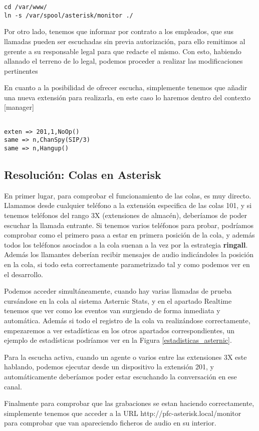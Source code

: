 \begin{lstlisting}[style=consola]
cd /var/www/
ln -s /var/spool/asterisk/monitor ./
\end{lstlisting}

Por otro lado, tenemos que informar por contrato a los empleados, que sus llamadas pueden ser escuchadas sin previa autorización, para ello remitimos al gerente a su responsable legal para que redacte el mismo. Con esto, habiendo allanado el terreno de lo legal, podemos proceder a realizar las modificaciones pertinentes

En cuanto a la posibilidad de ofrecer escucha, simplemente tenemos que añadir una nueva extensión para realizarla, en este caso lo haremos dentro del contexto [manager]

\begin{lstlisting}[style=bash,title={/etc/asterisk/extensions.conf}]

exten => 201,1,NoOp()
same => n,ChanSpy(SIP/3)
same => n,Hangup()

\end{lstlisting}

\subsection{Resolución: Colas en Asterisk}

En primer lugar, para comprobar el funcionamiento de las colas, es muy directo. Llamamos desde cualquier teléfono a la extensión especifica de las colas 101, y si tenemos teléfonos del rango 3X (extensiones de almacén), deberíamos de poder escuchar la llamada entrante. Si tenemos varios teléfonos para probar, podríamos comprobar como el primero pasa a estar en primera posición de la cola, y además todos los teléfonos asociados a la cola suenan a la vez por la estrategia \textbf{ringall}. Además los llamantes deberían recibir mensajes de audio indicándoles la posición en la cola, si todo esta correctamente parametrizado tal y como podemos ver en el desarrollo.

Podemos acceder simultáneamente, cuando hay varias llamadas de prueba cursándose en la cola al sistema Asternic Stats, y en el apartado Realtime tenemos que ver como los eventos van surgiendo de forma inmediata y automática. Además si todo el registro de la cola va realizándose correctamente, empezaremos a ver estadísticas en los otros apartados correspondientes, un ejemplo de estadísticas podríamos ver en la Figura \ref{estadisticas_asternic}.


Para la escucha activa, cuando un agente o varios entre las extensiones 3X este hablando, podemos ejecutar desde un dispositivo la extensión 201, y automáticamente deberíamos poder estar escuchando la conversación en ese canal.

Finalmente para comprobar que las grabaciones se estan haciendo correctamente, simplemente tenemos que acceder a la URL http://pfc-asterisk.local/monitor para comprobar que van apareciendo ficheros de audio en su interior.